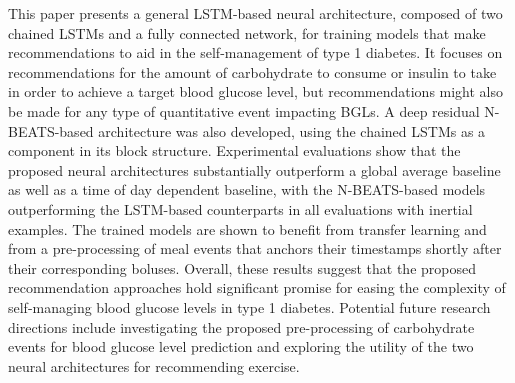 \documentclass[journal,article,submit,moreauthors,pdftex]{Definitions/mdpi}
\begin{document}
This paper presents a general LSTM-based neural architecture, composed of two chained LSTMs and a fully connected network, for training models that make recommendations to aid in the self-management of type 1 diabetes.  It focuses on recommendations for the amount of carbohydrate to consume or insulin to take in order to achieve a target blood glucose level, but recommendations might also be made for any type of quantitative event impacting BGLs. A deep residual N-BEATS-based architecture was also developed, using the chained LSTMs as a component in its block structure. Experimental evaluations show that the proposed neural architectures substantially outperform a global average baseline as well as a time of day dependent baseline, with the N-BEATS-based models outperforming the LSTM-based counterparts in all evaluations with inertial examples. The trained models are shown to benefit from transfer learning and from a pre-processing of meal events that anchors their timestamps shortly after their corresponding boluses. Overall, these results suggest that the proposed recommendation approaches hold significant promise for easing the complexity of self-managing blood glucose levels in type 1 diabetes. Potential future research directions include investigating the proposed pre-processing of carbohydrate events for blood glucose level prediction and exploring the utility of the two neural architectures for recommending exercise.



\end{document}
